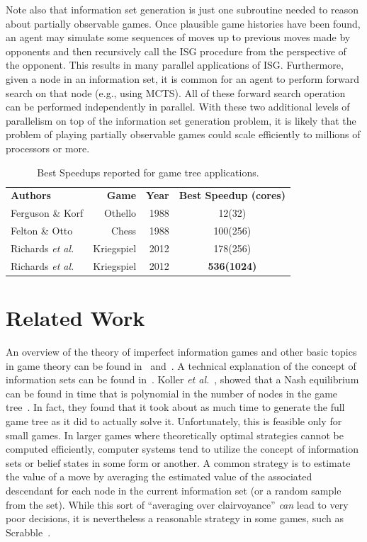 \documentclass[10pt, conference, compsocconf]{IEEEtran}
\newcommand{\etal}{{\em et al.}\ }
\begin{document}
Note also that information set generation is just one subroutine needed to
reason about partially observable games.  Once plausible game histories have
been found, an agent may simulate some sequences of moves up to previous moves
made by opponents and then recursively call the ISG procedure from the
perspective of the opponent.  This results in many parallel applications of
ISG. Furthermore, given a node in an information set, it is common for an agent
to perform forward search on that node (e.g., using MCTS).  All of these
forward search operation can be performed independently in parallel. With these
two additional levels of parallelism on top of the information set generation
problem, it is likely that the problem of playing partially observable
games could scale efficiently to millions of processors or more.
\begin{table}[ht]
\caption{Best Speedups reported for game tree applications.}
\centering
\begin{tabular}{lrrc}
{\bf Authors} & {\bf Game} & {\bf Year} & {\bf Best Speedup (cores)} \\
Ferguson \& Korf & Othello & 1988 & 12(32) \\
Felton \& Otto & Chess & 1988 & 100(256) \\
Richards \etal & Kriegspiel & 2012 & 178(256) \\
Richards \etal & Kriegspiel & 2012 & {\bf 536(1024)} \\
\end{tabular}
\label{bestspeedups}
\end{table}
\section{Related Work}
\label{Related}
An overview of the theory of imperfect information games and other basic topics
in game theory can be found in~\cite{kuhn03lectures} and~\cite{kuhn97classics}.
A technical explanation of the concept of information sets can be found
in~\cite{gilpin09algorithms}.  Koller \etal, showed that a Nash equilibrium can
be found in time that is polynomial in the number of nodes in the game
tree~\cite{koller94fast}.  In fact, they found that it took about as much time
to generate the full game tree as it did to actually solve it.  Unfortunately,
this is feasible only for small games.  In larger games where theoretically
optimal strategies cannot be computed efficiently, computer systems tend to
utilize the concept of information sets or belief states in some form or
another.  A common strategy is to estimate the value of a move by averaging the
estimated value of the associated descendant for each node in the current
information set (or a random sample from the set).  While this sort of
``averaging over clairvoyance'' {\em can} lead to very poor decisions, it is
nevertheless a reasonable strategy in some games, such as
Scrabble~\cite{sheppard02world}.
\end{document}
